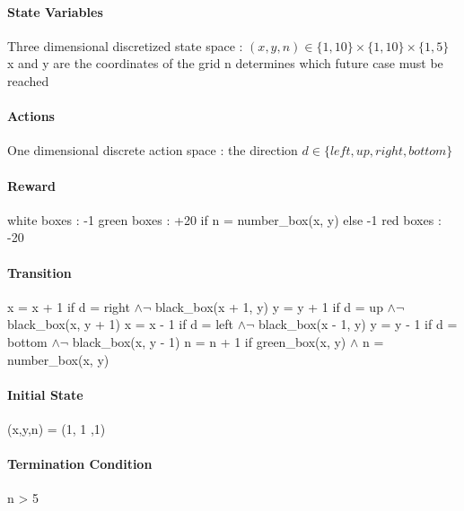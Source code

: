 \documentclass[a4paper,12pt]{article}
\begin{document}
    \paragraph{State Variables}
    Three dimensional discretized state space :\newline
    $(x,y,n) \in \{1, 10\} \times \{1, 10\} \times \{1, 5\}$ \newline
    x and y are the coordinates of the grid\newline
    n determines which future case must be reached
    
    \paragraph{Actions}
    One dimensional discrete action space : the direction \newline
    $d \in \{left, up, right, bottom\}$ 

     \paragraph{Reward} 
      white boxes : -1 \newline
      green boxes : +20 if n = number\_box(x, y) 
                    else -1 
      \newline
      red boxes : -20 
      
      \paragraph{Transition}  
	x = x + 1 if d = right $\wedge \neg$ black\_box(x + 1, y) \newline
	y = y + 1 if d = up $\wedge \neg$ black\_box(x, y + 1) \newline
	x = x - 1 if d = left $\wedge \neg$ black\_box(x - 1, y) \newline
	y = y - 1 if d = bottom $\wedge \neg$ black\_box(x, y - 1) \newline
	n = n + 1 if green\_box(x, y) $\wedge$ n = number\_box(x, y) 
      
      \paragraph{Initial State}
      (x,y,n) = (1, 1 ,1)
      
      \paragraph{Termination Condition}
      n > 5
      \\[1.5cm]
\end{document}
